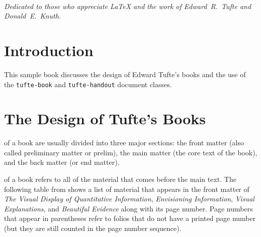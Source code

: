 \documentclass{tufte-book}
\newcommand{\VDQI}{\textit{The Visual Display of Quantitative Information}\xspace}
\newcommand{\EI}{\textit{Envisioning Information}\xspace}
\newcommand{\VE}{\textit{Visual Explanations}\xspace}
\newcommand{\BE}{\textit{Beautiful Evidence}\xspace}
\newcommand{\doccls}[1]{\texttt{#1}}%
\begin{document}
\tableofcontents

\listoffigures

\listoftables

\cleardoublepage
~\vfill
\begin{doublespace}
\noindent\fontsize{18}{22}\selectfont\itshape
\nohyphenation
Dedicated to those who appreciate \LaTeX{} 
and the work of \mbox{Edward R.~Tufte} 
and \mbox{Donald E.~Knuth}.
\end{doublespace}
\vfill
\vfill


\cleardoublepage
\chapter*{Introduction}

This sample book discusses the design of Edward Tufte's
books\cite{Tufte2001,Tufte1990,Tufte1997,Tufte2006}
and the use of the \doccls{tufte-book} and \doccls{tufte-handout} document classes.


\mainmatter


\chapter{The Design of Tufte's Books}
\label{ch:tufte-design}


 of a book are usually divided into three major
sections: the front matter (also called preliminary matter or prelim), the
main matter (the core text of the book), and the back matter (or end
matter).

 of a book refers to all of the material that
comes before the main text.  The following table from shows a list of
material that appears in the front matter of \VDQI, \EI, \VE, and \BE
along with its page number.  Page numbers that appear in parentheses refer
to folios that do not have a printed page number (but they are still
counted in the page number sequence).
\end{document}
